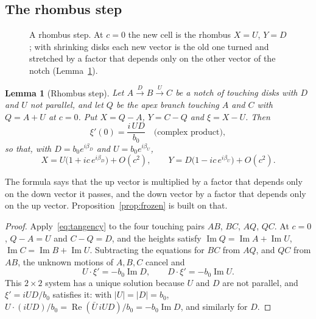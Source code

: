 \documentclass[11pt]{amsart}
\newtheorem{lemma}{Lemma}[section]
\theoremstyle{definition}
\DeclareMathOperator{\Real}{Re}
\DeclareMathOperator{\Imag}{Im}
\begin{document}
\subsection{The rhombus step}
\begin{figure}[t]
\centering
{}
\caption{A rhombus step. At $c=0$ the new cell is the rhombus $X=U$, $Y=D$; with shrinking disks
each new vector is the old one turned and stretched by a factor that depends only on the other
vector of the notch (Lemma~\ref{lem:rhombus}).}\label{fig:rhombus}
\end{figure}

\begin{lemma}[Rhombus step]\label{lem:rhombus}
Let $A\xrightarrow{D}B\xrightarrow{U}C$ be a notch of touching disks with $D$ and $U$ not parallel,
and let $Q$ be the apex branch touching $A$ and $C$ with $Q=A+U$ at $c=0$. Put $X=Q-A$, $Y=C-Q$ and
$\xi=X-U$. Then
\[
\xi'(0)=\frac{i\,UD}{b_0}\quad\text{(complex product)},
\]
so that, with $D=b_0e^{i\beta_D}$ and $U=b_0e^{i\beta_U}$,
\[
X=U\bigl(1+ic\,e^{i\beta_D}\bigr)+O(c^2),\qquad Y=D\bigl(1-ic\,e^{i\beta_U}\bigr)+O(c^2).
\]
\end{lemma}

The formula says that the up vector is multiplied by a factor that depends only on the down vector it
passes, and the down vector by a factor that depends only on the up vector. Proposition~\ref{prop:frozen}
is built on that.

\begin{proof}
Apply~\eqref{eq:tangency} to the four touching pairs $AB$, $BC$, $AQ$, $QC$. At $c=0$, $Q-A=U$ and
$C-Q=D$, and the heights satisfy $\Imag Q=\Imag A+\Imag U$, $\Imag C=\Imag B+\Imag U$. Subtracting the
equations for $BC$ from $AQ$, and $QC$ from $AB$, the unknown motions of $A,B,C$ cancel and
\[
U\cdot\xi'=-b_0\Imag D,\qquad D\cdot\xi'=-b_0\Imag U.
\]
This $2\times2$ system has a unique solution because $U$ and $D$ are not parallel, and
$\xi'=iUD/b_0$ satisfies it: with $|U|=|D|=b_0$, $U\cdot(iUD)/b_0=\Real(\bar U\,iUD)/b_0=-b_0\Imag D$,
and similarly for $D$.
\end{proof}
\end{document}
